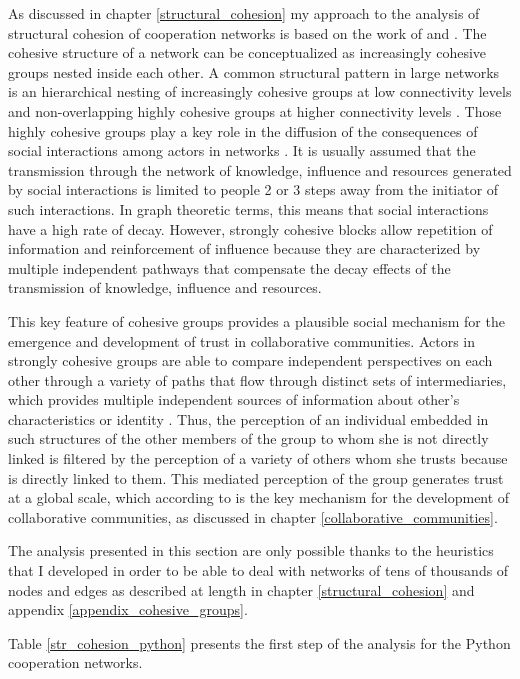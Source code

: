 As discussed in chapter \ref{structural_cohesion} my approach to the analysis of structural cohesion of cooperation networks is based on the work of \citet{white:2001} and \citet{moody:2003}. The cohesive structure of a network can be conceptualized as increasingly cohesive groups nested inside each other. A common structural pattern in large networks is an hierarchical nesting of increasingly cohesive groups at low connectivity levels and non-overlapping highly cohesive groups at higher connectivity levels \citep[112]{moody:2003}. Those highly cohesive groups play a key role in the diffusion of the consequences of social interactions among actors in networks \citep[355-356]{white:2001}. It is usually assumed that the transmission through the network of knowledge, influence and resources generated by social interactions is limited to people 2 or 3 steps away from the initiator of such interactions. In graph theoretic terms, this means that social interactions have a high rate of decay. However, strongly cohesive blocks allow repetition of information and reinforcement of influence because they are characterized by multiple independent pathways that compensate the decay effects of the transmission of knowledge, influence and resources.

This key feature of cohesive groups provides a plausible social mechanism for the emergence and development of trust in collaborative communities. Actors in strongly cohesive groups are able to compare independent perspectives on each other through a variety of paths that flow through distinct sets of intermediaries, which provides multiple independent sources of information about other's characteristics or identity \citep[320]{white:2001}. Thus, the perception of an individual embedded in such structures of the other members of the group to whom she is not directly linked is filtered by the perception of a variety of others whom she trusts because is directly linked to them. This mediated perception of the group generates trust at a global scale, which according to \citet{adler:2006} is the key mechanism for the development of collaborative communities, as discussed in chapter \ref{collaborative_communities}.

The analysis presented in this section are only possible thanks to the heuristics that I developed in order to be able to deal with networks of tens of thousands of nodes and edges as described at length in chapter \ref{structural_cohesion} and appendix \ref{appendix_cohesive_groups}. 

Table \ref{str_cohesion_python} presents the first step of the analysis for the Python cooperation networks.

